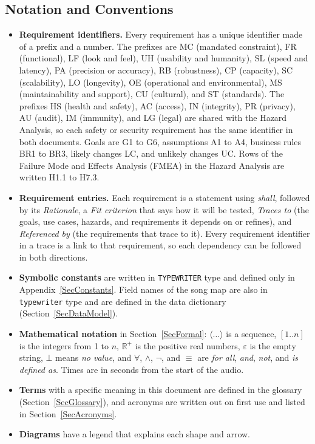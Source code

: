 \documentclass[12pt]{article}
\newcommand{\cn}[1]{\texttt{#1}}
\begin{document}
\subsection*{Notation and Conventions}

\begin{itemize}
  \item \textbf{Requirement identifiers.} Every requirement has a unique
        identifier made of a prefix and a number. The prefixes are MC
        (mandated constraint), FR (functional), LF (look and feel), UH
        (usability and humanity), SL (speed and latency), PA (precision or
        accuracy), RB (robustness), CP (capacity), SC (scalability), LO
        (longevity), OE (operational and environmental), MS (maintainability
        and support), CU (cultural), and ST (standards). The prefixes HS
        (health and safety), AC (access), IN (integrity), PR (privacy), AU
        (audit), IM (immunity), and LG (legal) are shared with the Hazard
        Analysis, so each safety or security requirement has the same
        identifier in both documents. Goals are G1 to G6, assumptions A1 to
        A4, business rules BR1 to BR3, likely changes LC, and unlikely
        changes UC. Rows of the Failure Mode and Effects Analysis (FMEA) in
        the Hazard Analysis are written H1.1 to H7.3.
  \item \textbf{Requirement entries.} Each requirement is a statement using
        \emph{shall}, followed by its \emph{Rationale}, a \emph{Fit
        criterion} that says how it will be tested, \emph{Traces to} (the
        goals, use cases, hazards, and requirements it depends on or refines),
        and \emph{Referenced by} (the requirements that trace to it). Every
        requirement identifier in a trace is a link to that requirement, so
        each dependency can be followed in both directions.
  \item \textbf{Symbolic constants} are written in \cn{TYPEWRITER} type and
        defined only in Appendix~\ref{SecConstants}. Field names of the song
        map are also in \texttt{typewriter} type and are defined in the data
        dictionary (Section~\ref{SecDataModel}).
  \item \textbf{Mathematical notation} in Section~\ref{SecFormal}:
        $\langle \ldots \rangle$ is a sequence, $[1..n]$ is the integers from
        1 to $n$, $\mathbb{R}^{+}$ is the positive real numbers, $\varepsilon$
        is the empty string, $\bot$ means \emph{no value}, and $\forall$,
        $\wedge$, $\neg$, and $\equiv$ are \emph{for all}, \emph{and},
        \emph{not}, and \emph{is defined as}. Times are in seconds from the
        start of the audio.
  \item \textbf{Terms} with a specific meaning in this document are defined
        in the glossary (Section~\ref{SecGlossary}), and acronyms are written
        out on first use and listed in Section~\ref{SecAcronyms}.
  \item \textbf{Diagrams} have a legend that explains each shape and arrow.
\end{itemize}
\end{document}

